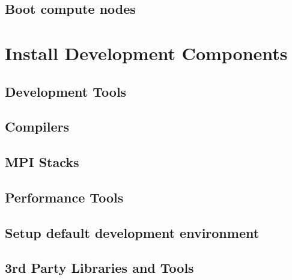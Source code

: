 \documentclass[letterpaper]{article}
\begin{document}
\subsection{Boot compute nodes} \label{sec:boot_computes}
 

\vspace*{-0.50cm}
\section{Install \OHPC{} Development Components}


\vspace*{-0.15cm}
\subsection{Development Tools} \label{sec:install_dev_tools}


\vspace*{-0.15cm}
\subsection{Compilers} \label{sec:install_compilers}


\subsection{MPI Stacks} \label{sec:mpi}


\subsection{Performance Tools} \label{sec:install_perf_tools}


\subsection{Setup default development environment}


\subsection{3rd Party Libraries and Tools} \label{sec:3rdparty}



\vspace*{0.1cm}

\end{document}
